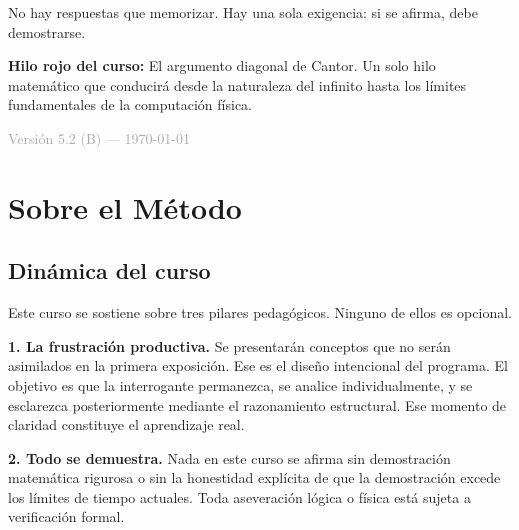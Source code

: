 \documentclass[11pt, letterpaper]{article}
\begin{document}
\begin{titlepage}
\begin{center}
\begin{tcolorbox}[
  colback=mitred!4, colframe=mitred,
  boxrule=0.8pt, left=10pt, right=10pt, top=8pt, bottom=8pt]
{\medskip
No hay respuestas que memorizar. Hay una sola exigencia:
si se afirma, debe demostrarse.}
\end{tcolorbox}

\vspace{1.2cm}

\begin{tcolorbox}[
  colback=white, colframe=diagonalred,
  boxrule=0.6pt, left=8pt, right=8pt, top=6pt, bottom=6pt]
{\footnotesize\textbf{Hilo rojo del curso:} El argumento diagonal de Cantor. Un solo hilo matem\'atico que conducir\'a desde la naturaleza del infinito hasta los l\'imites fundamentales de la computaci\'on f\'isica.}
\end{tcolorbox}

\vfill
{\small\textcolor{darkgray}{Versi\'on 5.2 (B) --- \today}}
\end{center}
\end{titlepage}

\tableofcontents
\newpage

\section*{Sobre el M\'etodo}

\subsection*{Din\'amica del curso}

Este curso se sostiene sobre tres pilares pedag\'ogicos. Ninguno de ellos es opcional.

\textbf{1. La frustraci\'on productiva.}
Se presentar\'an conceptos que no ser\'an asimilados en la primera exposici\'on. Ese es el dise\~no intencional del programa. El objetivo es que la interrogante permanezca, se analice individualmente, y se esclarezca posteriormente mediante el razonamiento estructural. Ese momento de claridad constituye el aprendizaje real.

\textbf{2. Todo se demuestra.}
Nada en este curso se afirma sin demostraci\'on matem\'atica rigurosa o sin la honestidad expl\'icita de que la demostraci\'on excede los l\'imites de tiempo actuales. Toda aseveraci\'on l\'ogica o f\'isica est\'a sujeta a verificaci\'on formal.
\end{document}
